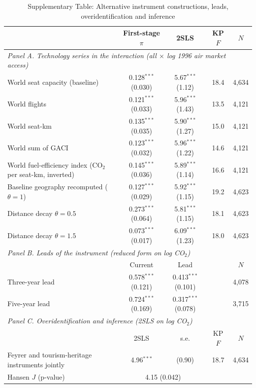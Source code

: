 \begin{table}[htbp]
\centering
\begin{threeparttable}
\caption{Supplementary Table: Alternative instrument constructions, leads, overidentification and inference}
\label{tab:exclusion2}
\scriptsize
\begin{tabular}{lcccc}
\toprule
 & First-stage $\pi$ & 2SLS & KP $F$ & $N$ \\
\midrule
\multicolumn{5}{l}{\textit{Panel A. Technology series in the interaction (all $\times$ log 1996 air market access)}} \\
  World seat capacity (baseline) & 0.128$^{***}$ (0.030) & 5.67$^{***}$ (1.12) & 18.4 & 4,634 \\
  World flights & 0.121$^{***}$ (0.033) & 5.96$^{***}$ (1.43) & 13.5 & 4,121 \\
  World seat-km & 0.135$^{***}$ (0.035) & 5.90$^{***}$ (1.27) & 15.0 & 4,121 \\
  World sum of GACI & 0.123$^{***}$ (0.032) & 5.96$^{***}$ (1.22) & 14.6 & 4,121 \\
  World fuel-efficiency index (CO$_2$ per seat-km, inverted) & 0.145$^{***}$ (0.036) & 5.89$^{***}$ (1.14) & 16.6 & 4,121 \\
  Baseline geography recomputed ($\theta = 1$) & 0.127$^{***}$ (0.029) & 5.92$^{***}$ (1.15) & 19.2 & 4,623 \\
  Distance decay $\theta = 0.5$ & 0.273$^{***}$ (0.064) & 5.81$^{***}$ (1.15) & 18.1 & 4,623 \\
  Distance decay $\theta = 1.5$ & 0.073$^{***}$ (0.017) & 6.09$^{***}$ (1.23) & 18.0 & 4,623 \\
\midrule
\multicolumn{5}{l}{\textit{Panel B. Leads of the instrument (reduced form on log CO$_2$)}} \\
 & Current & Lead & & $N$ \\
  Three-year lead & 0.578$^{***}$ (0.121) & 0.413$^{***}$ (0.101) & & 4,078 \\
  Five-year lead & 0.724$^{***}$ (0.169) & 0.317$^{***}$ (0.078) & & 3,715 \\
\midrule
\multicolumn{5}{l}{\textit{Panel C. Overidentification and inference (2SLS on log CO$_2$)}} \\
 & 2SLS & s.e. & KP $F$ & $N$ \\
  Feyrer and tourism-heritage instruments jointly & 4.96$^{***}$ & (0.90) & 18.7 & 4,634 \\
  \quad Hansen $J$ (p-value) & \multicolumn{2}{c}{4.15 (0.042)} & & \\

\end{tabular}
\end{threeparttable}
\end{table}
